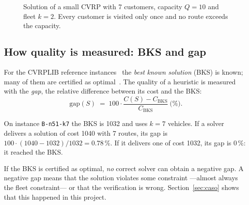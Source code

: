 \documentclass[11pt,a4paper]{article}
\newcommand{\tsl}[1]{\texttt{\small #1}}
\begin{document}
\begin{figure}[H]
\centering
{}
\caption{Solution of a small CVRP with 7 customers, capacity $Q=10$ and fleet $k=2$. Every customer is
visited only once and no route exceeds the capacity.}
\label{fig:cvrp}
\end{figure}

\subsection{How quality is measured: BKS and gap}
For the CVRPLIB reference instances~\cite{cvrplib} the \emph{best known solution} (BKS) is known; many
of them are certified as optimal~\cite{queiroga2021}. The quality of a heuristic is measured with the
\emph{gap}, the relative difference between its cost and the BKS:
\begin{equation}
\mathrm{gap}(S) \;=\; 100\cdot\frac{C(S)-C_{\mathrm{BKS}}}{C_{\mathrm{BKS}}}\ \text{(\%)}.
\label{eq:gap}
\end{equation}

\begin{ejemplo}
On instance \tsl{B-n51-k7} the BKS is 1032 and uses $k=7$ vehicles. If a solver delivers a solution
of cost 1040 with 7 routes, its gap is $100\cdot(1040-1032)/1032 = 0.78$\,\%. If it delivers one of
cost 1032, its gap is 0\,\%: it reached the BKS.
\end{ejemplo}

\begin{ideaclave}
If the BKS is certified as optimal, \emph{no} correct solver can obtain a negative gap. A negative gap
means that the solution violates some constraint ---almost always the fleet constraint--- or that the
verification is wrong. Section~\ref{sec:caso} shows that this happened in this project.
\end{ideaclave}
\end{document}
